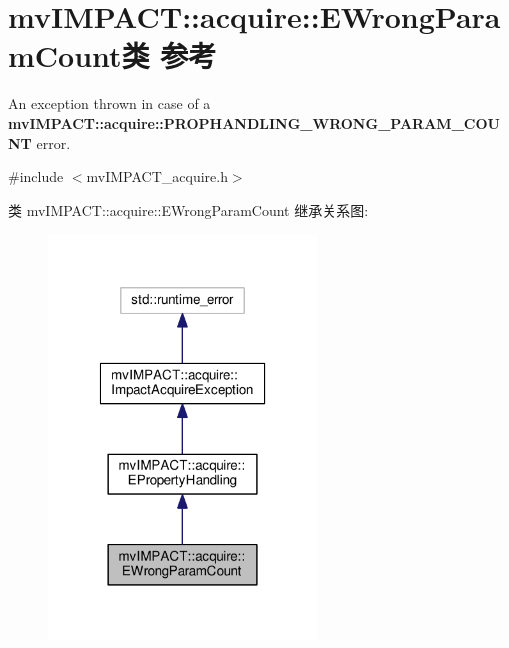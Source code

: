 \hypertarget{classmv_i_m_p_a_c_t_1_1acquire_1_1_e_wrong_param_count}{\section{mv\+I\+M\+P\+A\+C\+T\+:\+:acquire\+:\+:E\+Wrong\+Param\+Count类 参考}
\label{classmv_i_m_p_a_c_t_1_1acquire_1_1_e_wrong_param_count}
}


An exception thrown in case of a {\bfseries mv\+I\+M\+P\+A\+C\+T\+::acquire\+::\+P\+R\+O\+P\+H\+A\+N\+D\+L\+I\+N\+G\+\_\+\+W\+R\+O\+N\+G\+\_\+\+P\+A\+R\+A\+M\+\_\+\+C\+O\+U\+N\+T} error.  




{\ttfamily \#include $<$mv\+I\+M\+P\+A\+C\+T\+\_\+acquire.\+h$>$}



类 mv\+I\+M\+P\+A\+C\+T\+:\+:acquire\+:\+:E\+Wrong\+Param\+Count 继承关系图\+:
\nopagebreak
\begin{figure}[H]
\begin{center}
\leavevmode
\includegraphics[width=202pt]{classmv_i_m_p_a_c_t_1_1acquire_1_1_e_wrong_param_count__inherit__graph}
\end{center}
\end{figure}


